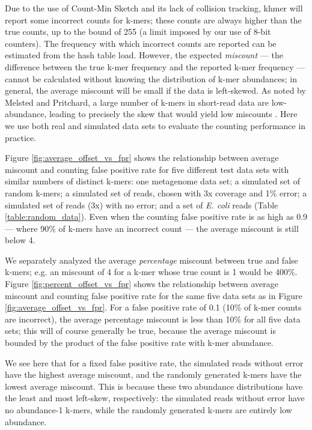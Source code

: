 Due to the use of Count-Min Sketch and its lack of collision tracking,
khmer will report some incorrect counts for k-mers; these counts are
always higher than the true counts, up to the bound of 255 (a limit
imposed by our use of 8-bit counters). The frequency with which
incorrect counts are reported can be estimated from the hash table
load.  However, the expected {\em miscount} --- the difference between
the true k-mer frequency and the reported k-mer frequency --- cannot
be calculated without knowing the distribution of k-mer abundances; in
general, the average miscount will be small if the data is
left-skewed.  As noted by Melsted and Pritchard, a large number of
k-mers in short-read data are low-abundance, leading to precisely the
skew that would yield low miscounts \cite{Melsted2011}.  Here we use
both real and simulated data sets to evaluate the counting performance
in practice.

Figure \ref{fig:average_offset_vs_fpr} shows the relationship between
average miscount and counting false positive rate for five different test data
sets with similar numbers of distinct k-mers: one metagenome data set;
a simulated set of random k-mers; a simulated set of reads, chosen
with 3x coverage and 1\% error; a simulated set of reads (3x) with no
error; and a set of {\em E. coli} reads (Table
\ref{table:random_data}).  Even when the counting false positive rate is as
high as 0.9 --- where 90\% of k-mers have an incorrect count --- the
average miscount is still below 4.

We separately analyzed the average {\em percentage} miscount between
true and false k-mers; e.g. an miscount of 4 for a k-mer whose true
count is 1 would be 400\%.  Figure \ref{fig:percent_offset_vs_fpr}
shows the relationship between average miscount and counting false
positive rate for the same five data sets as in Figure
\ref{fig:average_offset_vs_fpr}.  For a false positive rate of 0.1 (10\% of
k-mer counts are incorrect), the average percentage miscount is less
than 10\% for all five data sets; this will of course generally be
true, because the average miscount is bounded by the product of the
false positive rate with k-mer abundance.

We see here that for a fixed false positive rate, the simulated reads
without error have the highest average miscount, and the randomly
generated k-mers have the lowest average miscount.  This is because
these two abundance distributions have the least and most left-skew,
respectively: the simulated reads without error have no abundance-1
k-mers, while the randomly generated k-mers are entirely low
abundance.

